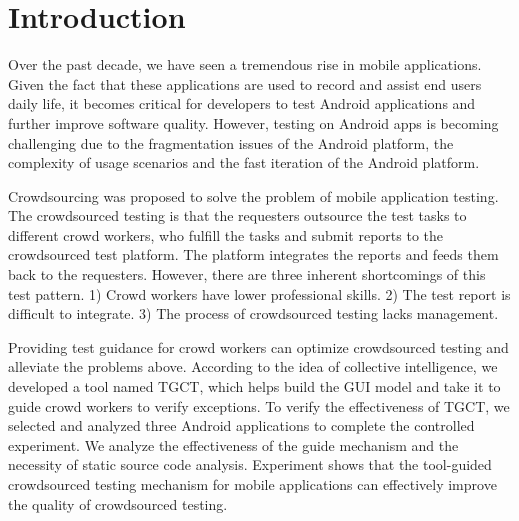 \section{Introduction}
Over the past decade, we have seen a tremendous rise in mobile applications. Given the fact that these applications are used to record and assist end users daily life, it becomes critical for developers to test Android applications and further improve software quality. However, testing on Android apps is becoming challenging due to the fragmentation issues of the Android platform\cite{b1}, the complexity of usage scenarios and the fast iteration of the Android platform.

Crowdsourcing was proposed to solve the problem of mobile application testing. The crowdsourced testing is that the requesters outsource the test tasks to different crowd workers, who fulfill the tasks and submit reports to the crowdsourced test platform. The platform integrates the reports and feeds them back to the requesters\cite{b2}. However, there are three inherent shortcomings of this test pattern. 1) Crowd workers have lower professional skills. 2) The test report is difficult to integrate. 3) The process of crowdsourced testing lacks management. 

Providing test guidance for crowd workers can optimize crowdsourced testing and alleviate the problems above\cite{b3}. According to the idea of collective intelligence\cite{b4}, we developed a tool named TGCT, which helps build the GUI model and take it to guide crowd workers to verify exceptions. To verify the effectiveness of TGCT, we selected and analyzed three Android applications to complete the controlled experiment. We analyze the effectiveness of the guide mechanism and the necessity of static source code analysis. Experiment shows that the tool-guided crowdsourced testing mechanism for mobile applications can effectively improve the quality of crowdsourced testing.




